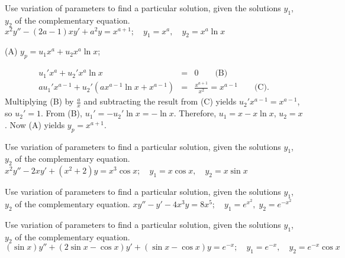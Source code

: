 \documentclass{ximera}
\begin{document}
\begin{problem}\label{exer:5.7.16}
Use variation
of parameters to find a particular solution, given the solutions
$y_1$, $y_2$ of the complementary equation. $x^2y''-(2a-1)xy'+a^2y=x^{a+1}; \quad  y_1=x^a,
\quad y_2=x^a \ln x$

\begin{solution}
(A) $y_p=u_1x^a+u_2x^a\ln x$;

\begin{eqnarray*}
u_1'x^a+u_2'x^a\ln x&=&0\qquad\text{(B)}\\ %
au_1'x^{a-1}+u_2'(ax^{a-1}\ln x+x^{a-1})&=&\frac{x^{a+1}}{x^2}=x^{a-1}\qquad\text{(C)}. %
\end{eqnarray*}
Multiplying (B) by $\frac{a}{x}$ and subtracting
the result from (C) yields $u_2'x^{a-1}=x^{a-1}$, so
$u_2'=1$. From (B), $u_1'=-u_2'\ln x=-\ln x$.
Therefore, $u_1=x-x\ln x$, $u_2=x$. Now (A) yields $y_p=x^{a+1}$.
\end{solution}
\end{problem}

\begin{problem}\label{exer:5.7.17}
Use variation
of parameters to find a particular solution, given the solutions
$y_1$, $y_2$ of the complementary equation. $x^2y''-2xy'+(x^2+2)y=x^3\cos x; \quad  y_1=x\cos x,
\quad y_2=x\sin x$
\end{problem}

\begin{problem}\label{exer:5.7.18}
Use variation
of parameters to find a particular solution, given the solutions
$y_1$, $y_2$ of the complementary equation. $xy''-y'-4x^3y=8x^5;\quad  y_1=e^{x^2},\;  y_2=e^{-x^2}$
\end{problem}

\begin{problem}\label{exer:5.7.19}
Use variation
of parameters to find a particular solution, given the solutions
$y_1$, $y_2$ of the complementary equation. $(\sin x)y''+(2\sin x-\cos x)y'+(\sin x-\cos x)y=e^{-x}; \quad
y_1=e^{-x},\quad y_2=e^{-x}\cos x$
\end{problem}
\end{document}
